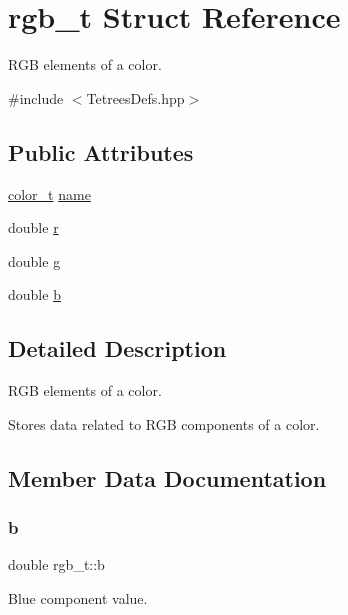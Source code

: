 \hypertarget{structrgb__t}{}\section{rgb\+\_\+t Struct Reference}
\label{structrgb__t}


R\+GB elements of a color.  




{\ttfamily \#include $<$Tetrees\+Defs.\+hpp$>$}

\subsection*{Public Attributes}
\begin{DoxyCompactItemize}
\item 
\mbox{\hyperlink{TetreesDefs_8hpp_a8ba5fbce2446135735693ab60c896bbd}{color\+\_\+t}} \mbox{\hyperlink{structrgb__t_a98fbae1e6897105536340238b9660ba5}{name}}
\item 
double \mbox{\hyperlink{structrgb__t_a89e46e1937cafe0683023100a5e1915a}{r}}
\item 
double \mbox{\hyperlink{structrgb__t_a626bf50c035e97070dcd72f3717ee64f}{g}}
\item 
double \mbox{\hyperlink{structrgb__t_ac93baee02597b8f626911b7ec88e5dec}{b}}
\end{DoxyCompactItemize}


\subsection{Detailed Description}
R\+GB elements of a color. 

Stores data related to R\+GB components of a color. 

\subsection{Member Data Documentation}
\mbox{\label{structrgb__t_ac93baee02597b8f626911b7ec88e5dec}} 
\subsubsection{\texorpdfstring{b}{b}}
{\footnotesize\ttfamily double rgb\+\_\+t\+::b}

Blue component value. \mbox{\label{structrgb__t_a626bf50c035e97070dcd72f3717ee64f}} 
